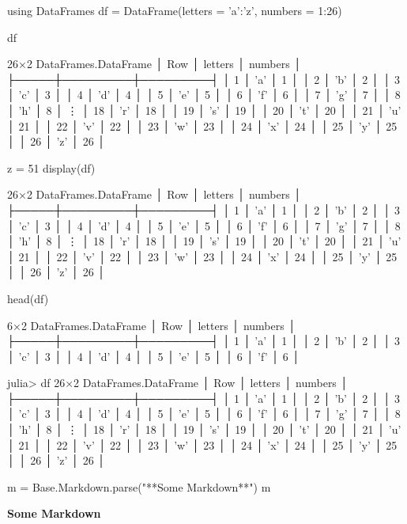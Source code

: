 

\begin{juliacode}
using DataFrames
df = DataFrame(letters = 'a':'z', numbers = 1:26)

df

\end{juliacode}
\begin{juliaout}
26×2 DataFrames.DataFrame
│ Row │ letters │ numbers │
├─────┼─────────┼─────────┤
│ 1   │ 'a'     │ 1       │
│ 2   │ 'b'     │ 2       │
│ 3   │ 'c'     │ 3       │
│ 4   │ 'd'     │ 4       │
│ 5   │ 'e'     │ 5       │
│ 6   │ 'f'     │ 6       │
│ 7   │ 'g'     │ 7       │
│ 8   │ 'h'     │ 8       │
⋮
│ 18  │ 'r'     │ 18      │
│ 19  │ 's'     │ 19      │
│ 20  │ 't'     │ 20      │
│ 21  │ 'u'     │ 21      │
│ 22  │ 'v'     │ 22      │
│ 23  │ 'w'     │ 23      │
│ 24  │ 'x'     │ 24      │
│ 25  │ 'y'     │ 25      │
│ 26  │ 'z'     │ 26      │
\end{juliaout}

\begin{juliacode}
z = 51
display(df)
\end{juliacode}
\begin{juliaout}
26×2 DataFrames.DataFrame
│ Row │ letters │ numbers │
├─────┼─────────┼─────────┤
│ 1   │ 'a'     │ 1       │
│ 2   │ 'b'     │ 2       │
│ 3   │ 'c'     │ 3       │
│ 4   │ 'd'     │ 4       │
│ 5   │ 'e'     │ 5       │
│ 6   │ 'f'     │ 6       │
│ 7   │ 'g'     │ 7       │
│ 8   │ 'h'     │ 8       │
⋮
│ 18  │ 'r'     │ 18      │
│ 19  │ 's'     │ 19      │
│ 20  │ 't'     │ 20      │
│ 21  │ 'u'     │ 21      │
│ 22  │ 'v'     │ 22      │
│ 23  │ 'w'     │ 23      │
│ 24  │ 'x'     │ 24      │
│ 25  │ 'y'     │ 25      │
│ 26  │ 'z'     │ 26      │
\end{juliaout}



\begin{juliacode}
head(df)
\end{juliacode}
\begin{juliaout}
6×2 DataFrames.DataFrame
│ Row │ letters │ numbers │
├─────┼─────────┼─────────┤
│ 1   │ 'a'     │ 1       │
│ 2   │ 'b'     │ 2       │
│ 3   │ 'c'     │ 3       │
│ 4   │ 'd'     │ 4       │
│ 5   │ 'e'     │ 5       │
│ 6   │ 'f'     │ 6       │
\end{juliaout}



\begin{juliaterm}
julia> df
26×2 DataFrames.DataFrame
│ Row │ letters │ numbers │
├─────┼─────────┼─────────┤
│ 1   │ 'a'     │ 1       │
│ 2   │ 'b'     │ 2       │
│ 3   │ 'c'     │ 3       │
│ 4   │ 'd'     │ 4       │
│ 5   │ 'e'     │ 5       │
│ 6   │ 'f'     │ 6       │
│ 7   │ 'g'     │ 7       │
│ 8   │ 'h'     │ 8       │
⋮
│ 18  │ 'r'     │ 18      │
│ 19  │ 's'     │ 19      │
│ 20  │ 't'     │ 20      │
│ 21  │ 'u'     │ 21      │
│ 22  │ 'v'     │ 22      │
│ 23  │ 'w'     │ 23      │
│ 24  │ 'x'     │ 24      │
│ 25  │ 'y'     │ 25      │
│ 26  │ 'z'     │ 26      │
\end{juliaterm}




\begin{juliacode}
m = Base.Markdown.parse("**Some Markdown**")
m
\end{juliacode}

\textbf{Some Markdown}

